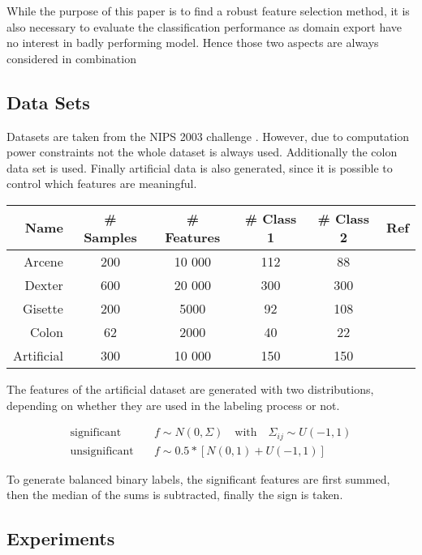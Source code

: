 \documentclass[twoside,11pt]{article}
\begin{document}
While the purpose of this paper is to find a robust feature selection method, it is also necessary to evaluate the classification performance as domain export have no interest in badly performing model. Hence those two aspects are always considered in combination

\subsection{Data Sets}
Datasets are taken from the NIPS 2003 challenge \cite{NIPS}. However, due to computation power constraints not the whole dataset is always used. Additionally the colon data set \cite{alon1999broad} is used. Finally artificial data is also generated, since it is possible to control which features are meaningful. 

\begin{center}
    \begin{tabular}{| r | c | c | c | c | c |}
    \hline
    Name & \# Samples & \# Features & \# Class 1 & \# Class 2 & Ref\\ \hline
    Arcene & 200 & 10 000 & 112 & 88 & \cite{NIPS} \\
    Dexter & 600 & 20 000 & 300 & 300 & \cite{NIPS} \\
    Gisette & 200 & 5000 & 92 & 108 & \cite{NIPS} \\
    Colon & 62 & 2000 & 40 & 22 &  \cite{alon1999broad} \\
    Artificial & 300 & 10 000 & 150 & 150 & \\
    \hline
    \end{tabular}
\end{center}

The features of the artificial dataset are generated with two distributions, depending on whether they are used in the labeling process or not.

\begin{align}
\text{significant} \quad & f \sim N(0, \Sigma) \quad \text{with} \quad \Sigma_{ij} \sim U(-1,1) \\
\text{unsignificant} \quad & f \sim 0.5 * \left[ N(0, 1) + U(-1,1) \right]
\end{align}

To generate balanced binary labels, the significant features are first summed, then the median of the sums is subtracted, finally the sign is taken. 





\subsection{Experiments}
\end{document}
